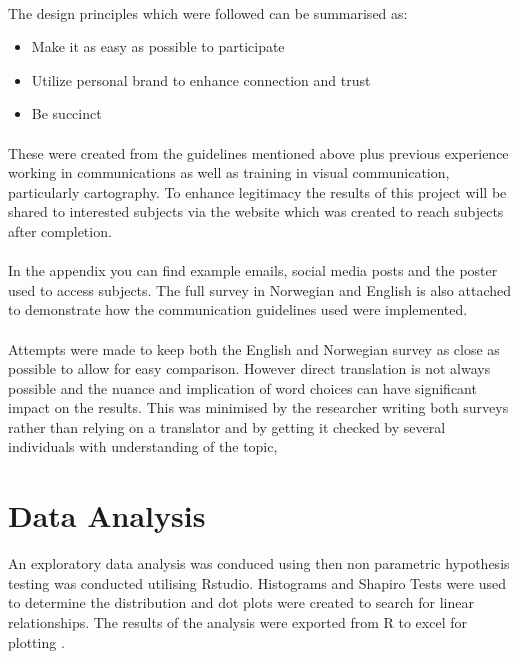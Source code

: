 \paragraph{}

The design principles which were followed can be summarised as:
\begin{itemize}
    \item Make it as easy as possible to participate
    \item Utilize personal brand to enhance connection and trust
    \item Be succinct
\end{itemize}
\paragraph{}
These were created from the guidelines mentioned above plus previous experience working in communications as well as training in visual communication, particularly cartography. To enhance legitimacy the results of this project will be shared to interested subjects via the website which was created to reach subjects after completion. 
\paragraph{}
In the appendix you can find example emails, social media posts and the poster used to access subjects. The full survey in Norwegian and English is also attached to demonstrate how the communication guidelines used were implemented.
\paragraph{}

Attempts were made to keep both the English and Norwegian survey as close as possible to allow for easy comparison. However direct translation is not always possible and the nuance and implication of word choices can have significant impact on the results. This was minimised by the researcher writing both surveys rather than relying on a translator and by getting it checked by several individuals with understanding of the topic,



\section{Data Analysis}
An exploratory data analysis was conduced using then non parametric hypothesis testing was conducted utilising Rstudio. Histograms and Shapiro Tests were used to determine the distribution and dot plots were created to search for linear relationships. The results of the analysis were exported from R to excel for plotting .
